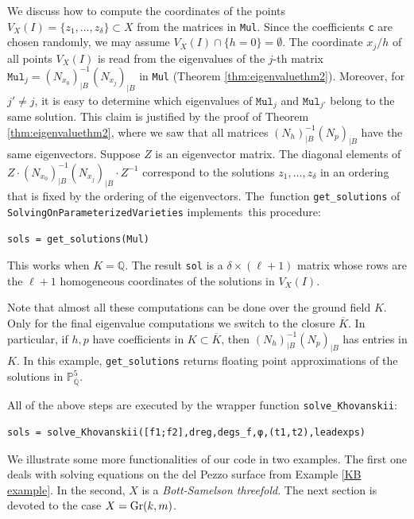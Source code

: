 \documentclass[12pt]{article}
\theoremstyle{definition}
\theoremstyle{remark}
\begin{document}
We discuss how to compute the coordinates of the points $V_X(I) = \{z_1, \ldots, z_\delta \} \subset X$ from the matrices in \texttt{Mul}. Since the coefficients \texttt{c} are chosen randomly, we may assume
$V_X(I) \cap \{ h = 0 \} = \emptyset$. The coordinate $x_j/h$ of all points $V_X(I)$ is read from the eigenvalues of the $j$-th matrix $\mathtt{Mul}_j = (N_{x_0})_{|B}^{-1} (N_{x_j})_{|B}$ in \texttt{Mul} (Theorem \ref{thm:eigenvaluethm2}). Moreover, for $j' \neq j$, it is easy to determine which eigenvalues of $\mathtt{Mul}_j$ and $\mathtt{Mul}_{j'}$ belong to the same solution. This claim is justified by the proof of Theorem \ref{thm:eigenvaluethm2}, where we saw that all matrices $(N_h)_{|B}^{-1}(N_p)_{|B}$ have the same eigenvectors. Suppose $Z$ is an eigenvector matrix. The diagonal elements of $Z \cdot (N_{x_0})_{|B}^{-1}(N_{x_j})_{|B} \cdot Z^{-1}$ correspond to the solutions $z_1, \ldots, z_\delta$ in an ordering that is fixed by the ordering of the eigenvectors. The~function \texttt{get\_solutions} of \texttt{SolvingOnParameterizedVarieties} implements~this procedure: 
\begin{verbatim}
sols = get_solutions(Mul)
\end{verbatim}
This works when $K = \mathbb{Q}$. The result \texttt{sol} is a $\delta \times (\ell+1)$ matrix whose rows are the $\ell + 1$ homogeneous coordinates of the solutions in $V_X(I)$. 

Note that almost all these computations can be done over the ground field $K$. Only for the final eigenvalue computations we switch to the closure $\overline{K}$. In particular, if $h,p$ have coefficients in $K \subset \overline{K}$, then $(N_h)_{|B}^{-1} (N_p)_{|B}$ has entries in $K$. In this example,
\texttt{get\_solutions} returns floating point approximations of the solutions in $\mathbb{P}_{\overline{\mathbb{Q}}}^5$.

All of the above steps are executed by the wrapper function \texttt{solve\_Khovanskii}:
\begin{verbatim}
sols = solve_Khovanskii([f1;f2],dreg,degs_f,φ,(t1,t2),leadexps)
\end{verbatim}

We illustrate some more functionalities of our code in two examples. The first one deals with solving equations on the del Pezzo surface from Example \ref{KB example}. In the second, $X$ is a \emph{Bott-Samelson threefold}. The next section is devoted to the case $X = {\rm Gr}(k,m)$. 
\end{document}

